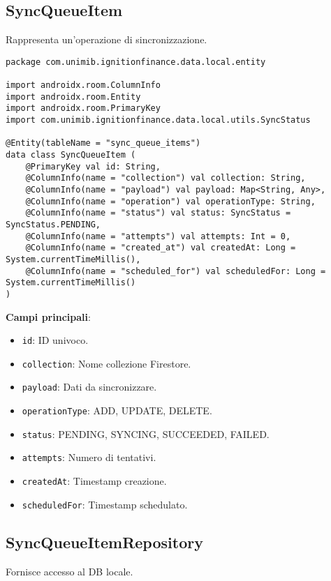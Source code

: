\subsection{SyncQueueItem}\label{subsec:syncqueueitem} Rappresenta un'operazione di sincronizzazione.

\begin{lstlisting}[caption=SyncQueueItem.kt, label=lst:syncqueueitem, basicstyle=\ttfamily\scriptsize, breaklines=true, breakatwhitespace=true, tabsize=4]
package com.unimib.ignitionfinance.data.local.entity

import androidx.room.ColumnInfo
import androidx.room.Entity
import androidx.room.PrimaryKey
import com.unimib.ignitionfinance.data.local.utils.SyncStatus

@Entity(tableName = "sync_queue_items")
data class SyncQueueItem (
    @PrimaryKey val id: String,
    @ColumnInfo(name = "collection") val collection: String,
    @ColumnInfo(name = "payload") val payload: Map<String, Any>,
    @ColumnInfo(name = "operation") val operationType: String,
    @ColumnInfo(name = "status") val status: SyncStatus = SyncStatus.PENDING,
    @ColumnInfo(name = "attempts") val attempts: Int = 0,
    @ColumnInfo(name = "created_at") val createdAt: Long = System.currentTimeMillis(),
    @ColumnInfo(name = "scheduled_for") val scheduledFor: Long = System.currentTimeMillis()
)
\end{lstlisting}

\textbf{Campi principali}:
\begin{itemize}
    \item \texttt{id}: ID univoco.
    \item \texttt{collection}: Nome collezione Firestore.
    \item \texttt{payload}: Dati da sincronizzare.
    \item \texttt{operationType}: ADD, UPDATE, DELETE.
    \item \texttt{status}: PENDING, SYNCING, SUCCEEDED, FAILED.
    \item \texttt{attempts}: Numero di tentativi.
    \item \texttt{createdAt}: Timestamp creazione.
    \item \texttt{scheduledFor}: Timestamp schedulato.
\end{itemize}

\subsection{SyncQueueItemRepository}\label{subsec:syncqueueitemrepository} Fornisce accesso al DB locale.

